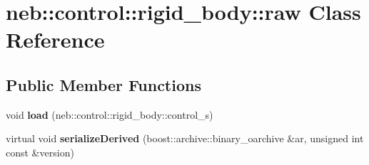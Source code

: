 \hypertarget{classneb_1_1control_1_1rigid__body_1_1raw}{\section{neb\-:\-:control\-:\-:rigid\-\_\-body\-:\-:raw \-Class \-Reference}
\label{classneb_1_1control_1_1rigid__body_1_1raw}
}
\subsection*{\-Public \-Member \-Functions}
\begin{DoxyCompactItemize}
\item 
\hypertarget{classneb_1_1control_1_1rigid__body_1_1raw_a79de740ae20967e3e3e3139c85766f41}{void {\bfseries load} (neb\-::control\-::rigid\-\_\-body\-::control\-\_\-s)}\label{classneb_1_1control_1_1rigid__body_1_1raw_a79de740ae20967e3e3e3139c85766f41}

\item 
\hypertarget{classneb_1_1control_1_1rigid__body_1_1raw_ac4d9998566b4832573c7d1cf63401ec2}{virtual void {\bfseries serialize\-Derived} (boost\-::archive\-::binary\-\_\-oarchive \&ar, unsigned int const \&version)}\label{classneb_1_1control_1_1rigid__body_1_1raw_ac4d9998566b4832573c7d1cf63401ec2}

\end{DoxyCompactItemize}
